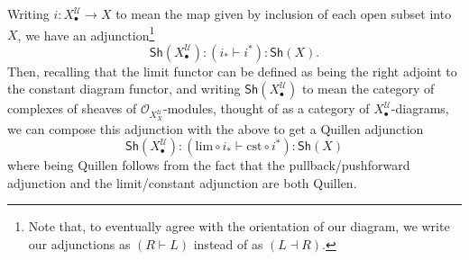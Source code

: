 \documentclass[11pt,fleqn]{article}
\theoremstyle{plain}
\theoremstyle{definition}
\theoremstyle{remark}
\numberwithin{equation}{theorem}
\newcommand{\cover}{\mathcal{U}}
\newcommand{\OO}{\mathcal{O}}
\newcommand{\cst}{\mathrm{cst}}
\newcommand{\gshX}{\mathsf{Sh}(X)}
\newcommand{\shX}{\mathsf{Sh}(\nerve{\bullet})}
\newcommand{\nerve}[1]{X_{#1}^\cover}
\begin{document}
        Writing $i\colon\nerve{\bullet}\to X$ to mean the map given by inclusion of each open subset into $X$, we have an adjunction\footnote{Note that, to eventually agree with the orientation of our diagram, we write our adjunctions as $(R\vdash L)$ instead of as $(L\dashv R)$.}
        \begin{equation*}
            \shX : (i_* \vdash i^*) : \gshX.
        \end{equation*}
        Then, recalling that the limit functor can be defined as being the right adjoint to the constant diagram functor, and writing $\shX$ to mean the category of complexes of sheaves of $\OO_{\nerve{X}}$-modules, thought of as a category of $\nerve{\bullet}$-diagrams, we can compose this adjunction with the above to get a Quillen adjunction
        \begin{equation*}
            \shX : (\mathrm{lim}\circ i_* \vdash \cst\circ i^*) : \gshX
        \end{equation*}
        where being Quillen follows from the fact that the pullback/pushforward adjunction and the limit/constant adjunction are both Quillen.
\end{document}
